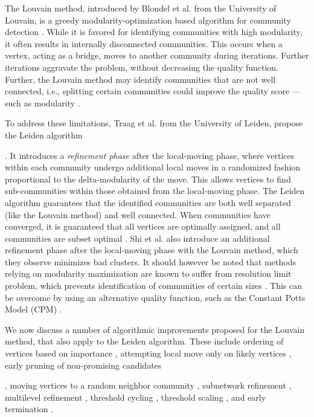 The Louvain method, introduced by Blondel et al. \cite{com-blondel08} from the University of Louvain, is a greedy modularity-optimization based algorithm for community detection \cite{com-lancichinetti09}. While it is favored for identifying communities with high modularity, it often results in internally disconnected communities. This occurs when a vertex, acting as a bridge, moves to another community during iterations. Further iterations aggravate the problem, without decreasing the quality function. Further, the Louvain method may identify communities that are not well connected, i.e., splitting certain communities could improve the quality score --- such as modularity \cite{com-traag19}.

To address these limitations, Traag et al. \cite{com-traag19} from the University of Leiden, propose the Leiden algorithm. It introduces a \textit{refinement phase} after the local-moving phase, where vertices within each community undergo additional local moves in a randomized fashion proportional to the delta-modularity of the move. This allows vertices to find sub-communities within those obtained from the local-moving phase. The Leiden algorithm guarantees that the identified communities are both well separated (like the Louvain method) and well connected. When communities have converged, it is guaranteed that all vertices are optimally assigned, and all communities are subset optimal \cite{com-traag19}. Shi et al. \cite{com-shi21} also introduce an additional refinement phase after the local-moving phase with the Louvain method, which they observe minimizes bad clusters. It should however be noted that methods relying on modularity maximization are known to suffer from resolution limit problem, which prevents identification of communities of certain sizes \cite{com-ghosh19, com-traag19}. This can be overcome by using an alternative quality function, such as the Constant Potts Model (CPM) \cite{com-traag11}.

We now discuss a number of algorithmic improvements proposed for the Louvain method, that also apply to the Leiden algorithm. These include ordering of vertices based on importance \cite{com-aldabobi22}, attempting local move only on likely vertices \cite{com-ryu16, com-ozaki16, com-zhang21, com-shi21}, early pruning of non-promising candidates \cite{com-ryu16, com-halappanavar17, com-zhang21, com-you22}, moving vertices to a random neighbor community \cite{com-traag15}, subnetwork refinement \cite{com-waltman13, com-traag19}, multilevel refinement \cite{com-rotta11, com-gach14, com-shi21}, threshold cycling \cite{com-ghosh18}, threshold scaling \cite{com-lu15, com-naim17, com-halappanavar17}, and early termination \cite{com-ghosh18}.

